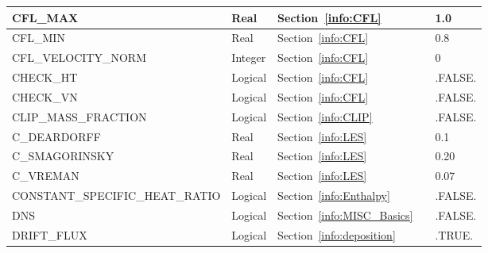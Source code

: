 \documentclass[11pt]{book}
\begin{document}
\begin{longtable}{@{\extracolsep{\fill}}|l|l|l|l|l|}
{\ct CFL\_MAX}                                  & Real          & Section~\ref{info:CFL}                                &               & 1.0               \\ \hline
{\ct CFL\_MIN}                                  & Real          & Section~\ref{info:CFL}                                &               & 0.8               \\ \hline
{\ct CFL\_VELOCITY\_NORM}                       & Integer       & Section~\ref{info:CFL}                                &               & 0                 \\ \hline
{\ct CHECK\_HT}                                 & Logical       & Section~\ref{info:CFL}                                &               & {\ct .FALSE.}     \\ \hline
{\ct CHECK\_VN}                                 & Logical       & Section~\ref{info:CFL}                                &               & {\ct .FALSE.}     \\ \hline
{\ct CLIP\_MASS\_FRACTION}                      & Logical       & Section~\ref{info:CLIP}                               &               & {\ct .FALSE.}     \\ \hline
{\ct C\_DEARDORFF}                              & Real          & Section~\ref{info:LES}                                &               & 0.1               \\ \hline
{\ct C\_SMAGORINSKY}                            & Real          & Section~\ref{info:LES}                                &               & 0.20              \\ \hline
{\ct C\_VREMAN}                                 & Real          & Section~\ref{info:LES}                                &               & 0.07              \\ \hline
{\ct CONSTANT\_SPECIFIC\_HEAT\_RATIO}           & Logical       & Section~\ref{info:Enthalpy}                           &               & {\ct .FALSE.}     \\ \hline
{\ct DNS}                                       & Logical       & Section~\ref{info:MISC_Basics}                        &               & {\ct .FALSE.}     \\ \hline
{\ct DRIFT\_FLUX}                               & Logical       & Section~\ref{info:deposition}                         &               & {\ct .TRUE.}      \\ \hline

\end{longtable}
\end{document}
